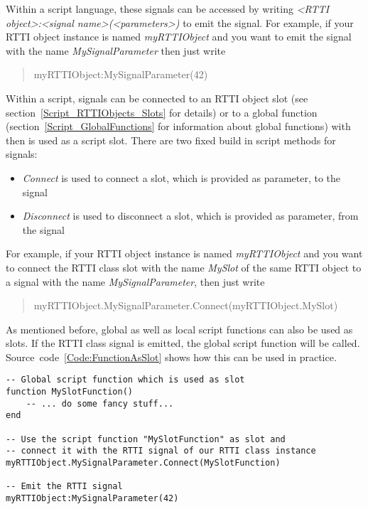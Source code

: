 Within a script language, these signals can be accessed by writing \emph{<RTTI object>:<signal name>(<parameters>)} to emit the signal. For example, if your RTTI object instance is named \emph{myRTTIObject} and you want to emit the signal with the name \emph{MySignalParameter} then just write \begin{quote}myRTTIObject:MySignalParameter(42)\end{quote}

Within a script, signals can be connected to an RTTI object slot (see section~\ref{Script_RTTIObjects_Slots} for details) or to a global function (section~\ref{Script_GlobalFunctions} for information about global functions) with then is used as a script slot. There are two fixed build in script methods for signals:
\begin{itemize}
\item{\emph{Connect} is used to connect a slot, which is provided as parameter, to the signal}
\item{\emph{Disconnect} is used to disconnect a slot, which is provided as parameter, from the signal}
\end{itemize}

For example, if your RTTI object instance is named \emph{myRTTIObject} and you want to connect the RTTI class slot with the name \emph{MySlot} of the same RTTI object to a signal with the name \emph{MySignalParameter}, then just write \begin{quote}myRTTIObject.MySignalParameter.Connect(myRTTIObject.MySlot)\end{quote}

As mentioned before, global as well as local script functions can also be used as slots. If the RTTI class signal is emitted, the global script function will be called. Source~code~\ref{Code:FunctionAsSlot} shows how this can be used in practice.
\begin{lstlisting}[float=htb,label=Code:FunctionAsSlot,caption={Function as slot}]
-- Global script function which is used as slot
function MySlotFunction()
	-- ... do some fancy stuff...
end

-- Use the script function "MySlotFunction" as slot and
-- connect it with the RTTI signal of our RTTI class instance
myRTTIObject.MySignalParameter.Connect(MySlotFunction)

-- Emit the RTTI signal
myRTTIObject:MySignalParameter(42)
\end{lstlisting}
